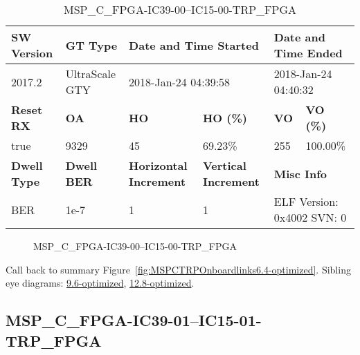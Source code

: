 \begin{table}[h]
\centering
\caption{MSP\_C\_FPGA-IC39-00--IC15-00-TRP\_FPGA}
\label{tab:MSPCFPGAIC3900IC1500TRPFPGA6.4-optimized}
\begin{tabular}{@{}|l|l|l|l|l|l|@{}}
\toprule
\textbf{SW Version}                & \textbf{GT Type}   & \multicolumn{2}{l|}{\textbf{Date and Time Started}}            & \multicolumn{2}{l|}{\textbf{Date and Time Ended}}        \\ \midrule
2017.2                       & UltraScale GTY          & \multicolumn{2}{l|}{2018-Jan-24 04:39:58}                   & \multicolumn{2}{l|}{2018-Jan-24 04:40:32}               \\ \midrule
\textbf{Reset RX}                  & \textbf{OA} & \textbf{HO}   & \textbf{HO (\%)} & \textbf{VO} & \textbf{VO (\%)} \\ \midrule
true & 9329        & 45          & 69.23\%        & 255        & 100.00\%       \\ \midrule
\textbf{Dwell Type}                & \textbf{Dwell BER} & \textbf{Horizontal Increment} & \textbf{Vertical Increment}    & \multicolumn{2}{l|}{\textbf{Misc Info}}                  \\ \midrule
BER                            & 1e-7        & 1        & 1           & \multicolumn{2}{l|}{ELF Version: 0x4002 SVN: 0}                         \\ \bottomrule
\end{tabular}
\end{table}

\begin{figure}[h]
\caption{MSP\_C\_FPGA-IC39-00--IC15-00-TRP\_FPGA} \label{fig:MSPCFPGAIC3900IC1500TRPFPGA6.4-optimized}
\end{figure}

Call back to summary Figure~\ref{fig:MSPCTRPOnboardlinks6.4-optimized}.
Sibling eye diagrams: \hyperref[sec:MSPCFPGAIC3900IC1500TRPFPGA9.6-optimized]{9.6-optimized}, \hyperref[sec:MSPCFPGAIC3900IC1500TRPFPGA12.8-optimized]{12.8-optimized}.

\clearpage
\newpage


\subsection{MSP\_C\_FPGA-IC39-01--IC15-01-TRP\_FPGA}\label{sec:MSPCFPGAIC3901IC1501TRPFPGA6.4-optimized}

